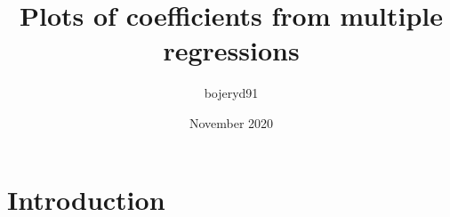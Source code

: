 \documentclass{article}
\title{Plots of coefficients from multiple regressions}
\author{bojeryd91 }
\date{November 2020}
\begin{document}
\maketitle

\section{Introduction}
\end{document}
